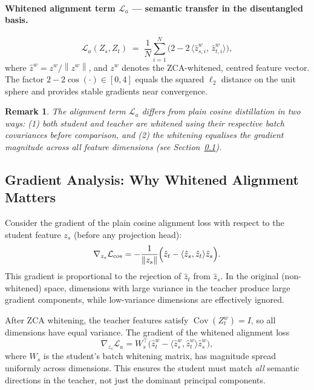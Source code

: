 \documentclass[11pt,a4paper]{article}
\newtheorem{remark}[theorem]{Remark}
\newcommand{\calL}{\mathcal{L}}
\newcommand{\norm}[1]{\left\|#1\right\|}
\newcommand{\Cov}{\operatorname{Cov}}
\begin{document}
\paragraph{Whitened alignment term $\calL_a$ — semantic transfer in the disentangled basis.}
\begin{equation}
    \calL_a(Z_s, Z_t) \;=\; \frac{1}{N}\sum_{i=1}^N
    \bigl(2 - 2\,\langle \hat{z}_{s,i}^w,\, \hat{z}_{t,i}^w\rangle\bigr),
\label{eq:align_loss}
\end{equation}
where $\hat{z}^w = z^w / \norm{z^w}$, and $z^w$ denotes the ZCA-whitened,
centred feature vector.  The factor $2 - 2\cos(\cdot) \in [0,4]$ equals the
squared $\ell_2$ distance on the unit sphere and provides stable gradients near
convergence.

\begin{remark}
The alignment term $\calL_a$ differs from plain cosine distillation in two ways:
(1) both student and teacher are whitened using their respective batch covariances
before comparison, and (2) the whitening equalises the gradient magnitude across
all feature dimensions (see Section~\ref{sec:gradient_analysis}).
\end{remark}

\subsection{Gradient Analysis: Why Whitened Alignment Matters}
\label{sec:gradient_analysis}

Consider the gradient of the plain cosine alignment loss with respect to the
student feature $z_s$ (before any projection head):
\[
    \nabla_{z_s} \calL_{\cos}
    = -\frac{1}{\norm{z_s}} \Bigl(
        \hat{z}_t - \langle \hat{z}_s, \hat{z}_t\rangle \hat{z}_s
      \Bigr).
\]
This gradient is proportional to the rejection of $\hat{z}_t$ from
$\hat{z}_s$.  In the original (non-whitened) space, dimensions with large
variance in the teacher produce large gradient components, while low-variance
dimensions are effectively ignored.

After ZCA whitening, the teacher features satisfy $\Cov(Z_t^w) = I$, so all
dimensions have equal variance.  The gradient of the whitened alignment loss
\[
    \nabla_{z_s} \calL_a
    = W_s^\top \bigl(\hat{z}_{t}^w - \langle \hat{z}_s^w, \hat{z}_t^w\rangle
      \hat{z}_s^w\bigr),
\]
where $W_s$ is the student's batch whitening matrix, has magnitude spread
uniformly across dimensions.  This ensures the student must match \emph{all}
semantic directions in the teacher, not just the dominant principal components.
\end{document}
